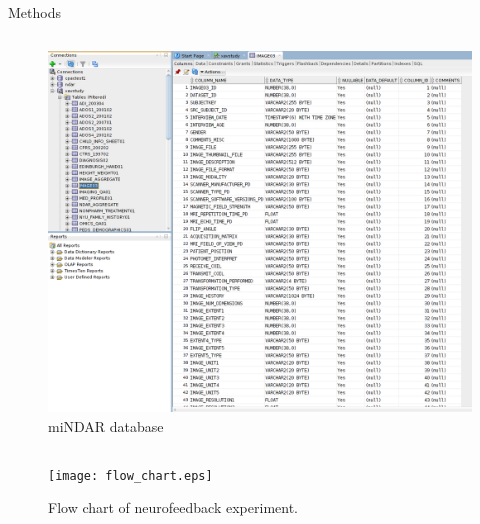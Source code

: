 \documentclass[final,hyperref={pdfpagelabels=false}]{beamer}
\begin{document}
\begin{frame}
\begin{columns}
\begin{column}{.5\textwidth}
{\begin{block}{Methods}
\begin{column}{.47\textwidth}
                    \begin{figure}
                        \begin{center}
                            \includegraphics[width=.9\textwidth]{mindar.png}
                        \end{center}
                        \caption{\label{fig:mindar}miNDAR database}
                    \end{figure}
                \end{column}
            \begin{figure}
                \begin{center}
                    \texttt{[image: flow\_chart.eps]}
                \end{center}
                \caption{\label{fig:processingflow}Flow chart of neurofeedback experiment.}
            \end{figure}    
            \vfill              
            \end{block}
          }
    \end{column}


\end{columns}
\end{frame}
\end{document}
